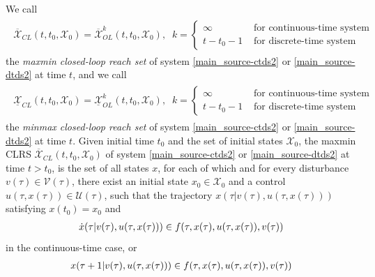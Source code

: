 \documentclass[letterpaper,10pt,english]{sphinxmanual}
\begin{document}
We call
\label{main_source:equation-maxminclrs}\begin{gather}
\begin{split}\overline{{\mathcal X}}_{CL}(t, t_0, {\mathcal X}_0) = \overline{{\mathcal X}}_{OL}^k(t, t_0, {\mathcal X}_0), \;\;
k = \left\{\begin{array}{ll}
\infty & \mbox{ for continuous-time system}\\
t-t_0-1 & \mbox{ for discrete-time system}\end{array}\right.\end{split}\label{main_source-maxminclrs}
\end{gather}
the \emph{maxmin closed-loop reach set} of system \eqref{main_source-ctds2} or \eqref{main_source-dtds2} at
time $t$, and we call
\label{main_source:equation-minmaxclrs}\begin{gather}
\begin{split}\underline{{\mathcal X}}_{CL}(t, t_0, {\mathcal X}_0) = \underline{{\mathcal X}}_{OL}^k(t, t_0, {\mathcal X}_0), \;\;
k = \left\{\begin{array}{ll}
\infty & \mbox{ for continuous-time system}\\
t-t_0-1 & \mbox{ for discrete-time system}\end{array}\right.\end{split}\label{main_source-minmaxclrs}
\end{gather}
the \emph{minmax closed-loop reach set} of system \eqref{main_source-ctds2} or \eqref{main_source-dtds2} at
time $t$.
Given initial time $t_0$ and the set of initial
states ${\mathcal X}_0$, the maxmin CLRS
$\overline{{\mathcal X}}_{CL}(t, t_0, {\mathcal X}_0)$ of system
\eqref{main_source-ctds2} or \eqref{main_source-dtds2} at time $t>t_0$, is the set of all states
$x$, for each of which and for every disturbance
$v(\tau)\in{\mathcal V}(\tau)$, there exist an initial state
$x_0\in{\mathcal X}_0$ and a control
$u(\tau, x(\tau))\in{\mathcal U}(\tau)$, such that the trajectory
$x(\tau | v(\tau), u(\tau, x(\tau)))$ satisfying
$x(t_0) = x_0$ and
\begin{gather}
\begin{split}\dot{x}(\tau | v(\tau), u(\tau, x(\tau))) \in
f(\tau, x(\tau), u(\tau, x(\tau)), v(\tau))\end{split}\notag
\end{gather}
in the continuous-time case, or
\begin{gather}
\begin{split}x(\tau+1 | v(\tau), u(\tau, x(\tau))) \in
f(\tau, x(\tau), u(\tau, x(\tau)), v(\tau))\end{split}\notag
\end{gather}
\end{document}
